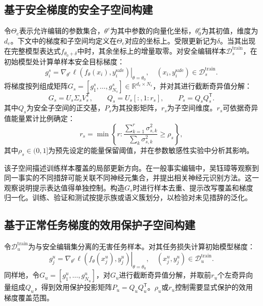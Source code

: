 
\subsection{基于安全梯度的安全子空间构建}

令$\Theta_e$表示允许编辑的参数集合，$\theta^{e}$为其中参数的向量化坐标，$\theta_0^{e}$为其初值，维度为$d_e$。下文中的梯度和子空间均定义在$\Theta_e$对应的坐标上。受限更新记为$\delta$。当其出现在完整模型表达式$f_{\theta_0+\delta}$中时，其余坐标上的增量取零。对安全编辑样本$\mathcal{D}_{s}^{\mathrm{train}}$，在初始模型处计算单样本安全目标梯度：
\begin{equation}
  g_i^{s}=
  \left.\nabla_{\theta^{e}}
  \ell\!\left(f_{\theta}(x_i),y_i^{\mathrm{safe}}\right)\right|_{\theta=\theta_0},
  \quad (x_i,y_i^{\mathrm{safe}})\in\mathcal{D}_{s}^{\mathrm{train}}.
  \label{eq:safety-gradient}
\end{equation}
将梯度按列组成矩阵$G_s=[g_1^s,\ldots,g_{N_s}^s]\in\mathbb{R}^{d_e\times N_s}$，并对其进行截断奇异值分解：
\begin{equation}
  G_s=U_s\Sigma_sV_s^{\mathsf T},\qquad
  Q_s=U_s[:,1:r_s],\qquad P_s=Q_sQ_s^{\mathsf T}.
  \label{eq:safety-subspace}
\end{equation}
其中$Q_s$为安全子空间的正交基，$P_s$为其投影矩阵，$r_s$为子空间维度。$r_s$可依据奇异值能量累计比例确定：
\begin{equation}
  r_s=\min\left\{r:
  \frac{\sum_{k=1}^{r}\sigma_{s,k}^{2}}
  {\sum_{k}\sigma_{s,k}^{2}}\ge \rho_s\right\},
  \label{eq:safety-rank}
\end{equation}
其中$\rho_s\in(0,1]$为预先设定的能量保留阈值，并在参数敏感性实验中分析其影响。

该子空间描述训练样本覆盖的局部更新方向。在一般事实编辑中，吴钰璋等观察到同一事实的不同措辞可能关联不同神经元集合，并提出相关神经元识别方法\cite{wu2025land}。这一观察说明提示表达值得单独控制。构造$G_s$时进行样本去重、提示改写覆盖和梯度归一化。训练、验证和测试按提示族或语义簇划分，以检验对未见措辞的泛化。

\subsection{基于正常任务梯度的效用保护子空间构建}

令$\mathcal{D}_{u}^{\mathrm{train}}$为与安全编辑集分离的无害任务样本。对其任务损失计算初始模型梯度：
\begin{equation}
  g_j^{u}=
  \left.\nabla_{\theta^{e}}
  \ell\!\left(f_{\theta}(x_j^{u}),y_j^{u}\right)\right|_{\theta=\theta_0},
  \quad (x_j^{u},y_j^{u})\in\mathcal{D}_{u}^{\mathrm{train}}.
  \label{eq:utility-gradient}
\end{equation}
同样地，令$G_u=[g_1^u,\ldots,g_{N_u}^u]$，对$G_u$进行截断奇异值分解，并取前$r_u$个左奇异向量组成$Q_u$，得到效用保护投影矩阵$P_u=Q_uQ_u^{\mathsf T}$。$\rho_u$或$r_u$控制需要显式保护的效用梯度覆盖范围。


